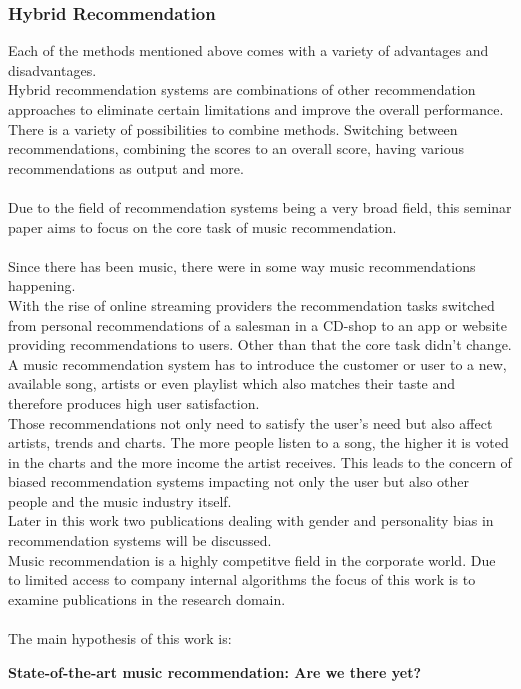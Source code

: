 \documentclass[runningheads,a4paper]{llncs}
\begin{document}
\subsubsection{Hybrid Recommendation}
Each of the methods mentioned above comes with a variety of advantages and disadvantages. \\
Hybrid recommendation systems are combinations of other recommendation approaches to eliminate certain 
limitations and improve the overall performance. 
There is a variety of possibilities to combine methods.
Switching between recommendations, combining the scores to an overall score, having various recommendations as output
 and more. \cite{burke2002hybrid}\\
\\
Due to the field of recommendation systems being a very broad field, this seminar paper aims to 
focus on the core task of music recommendation. \\
\\
Since there has been music, there were in some way music recommendations happening. \\
With the rise of online streaming providers the recommendation tasks switched from personal recommendations 
of a salesman in a CD-shop to an app or website providing recommendations to users.
Other than that the core task didn't change. A music recommendation system has to introduce the customer or user to a new, available song, artists or even playlist which 
also matches their taste and therefore produces high user satisfaction.\\
Those recommendations not only need to satisfy the user's need but also affect artists, trends and charts.
The more people listen to a song, the higher it is voted in the charts and the more income the artist receives. 
This leads to the concern of biased recommendation systems impacting not only the user but also other people and the music industry itself. \\
Later in this work two publications dealing with gender and personality bias in recommendation systems will be discussed. \\
Music recommendation is a highly competitve field in the corporate world. 
Due 
to limited access to company internal algorithms the focus of this work is to examine publications in the research domain. \\
\\ 
The main hypothesis of this work is:
\begin{center}
  \textbf{State-of-the-art music recommendation: Are we there yet?}
\end{center}
\end{document}
